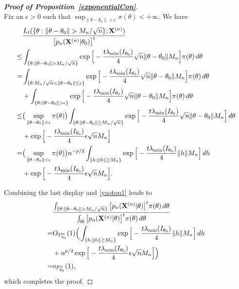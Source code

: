 \documentclass[11pt]{article}
\theoremstyle{plain}
\theoremstyle{definition}
\theoremstyle{remark}
\begin{document}
\begin{appendices}
\begin{proof}[\textbf{Proof of Proposition~\ref{exponentialCon}}]
$$    $$
    Fix an $\epsilon>0$ such that $\sup_{\|\theta-\theta_0\|< \epsilon}\pi(\theta) < +\infty $. We have
$$
    \begin{aligned}
        &
    \frac{L_t({\{\theta:\|\theta-\theta_0\|> M_n/\sqrt{n}\}};\BX^{(n)})}{
        \big[p_n(\BX^{(n)}|\theta_0)\big]^t 
    }
        \\
        \leq&
        \int_{\{\theta:\|\theta-\theta_0\|> M_n/\sqrt{n}\}} 
        \exp\Big[-\frac{t\lambda_{\min}(I_{\theta_0})}{4}\sqrt{n}\|\theta-\theta_0\|M_n\Big]
        \pi(\theta)\, d\theta
        \\
        =&
        \int_{\{\theta:M_n/\sqrt{n}< \|\theta-\theta_0\|\leq \epsilon \}} 
        \exp\Big[-\frac{t\lambda_{\min}(I_{\theta_0})}{4}\sqrt{n}\|\theta-\theta_0\|M_n\Big]
        \pi(\theta)\, d\theta
        \\
        &+
        \int_{\{\theta:\|\theta-\theta_0\|> \epsilon\}} 
        \exp\Big[-\frac{t\lambda_{\min}(I_{\theta_0})}{4}\sqrt{n}\|\theta-\theta_0\|M_n\Big]
        \pi(\theta)\, d\theta
        \\
        \leq& 
        \big(\sup_{\|\theta-\theta_0\|<\epsilon}\pi(\theta)\big)
        \int_{\{\theta: \|\theta-\theta_0\|\geq M_n/\sqrt{n}\}} 
        \exp\Big[-\frac{t\lambda_{\min}(I_{\theta_0})}{4}\sqrt{n}\|\theta-\theta_0\|M_n\Big]
        \, d\theta
        \\
        &+
        \exp\Big[-\frac{t\lambda_{\min}(I_{\theta_0})}{4}\epsilon\sqrt{n}M_n\Big]
        \\
        =& 
        \big(\sup_{\|\theta-\theta_0\|<\epsilon}\pi(\theta)\big)
        n^{-p/2}
        \int_{\{h: \|h\|\geq M_n\}} 
        \exp\Big[-\frac{t\lambda_{\min}(I_{\theta_0})}{4}\|h\| M_n\Big]
        \, dh
        \\
        &+
        \exp\Big[-\frac{t\lambda_{\min}(I_{\theta_0})}{4}\epsilon\sqrt{n}M_n\Big]
        .
    \end{aligned}
$$

Combining the last display and \eqref{yaotou1} leads to
$$
    \begin{aligned}
        &\frac{
            \int_{\{\theta:\|\theta-\theta_0\|> M_n/\sqrt{n}\}} \big[p_n(\BX^{(n)}|\theta)\big]^t \pi(\theta)\, d\theta
        }
        {
            \int_{\Theta} \big[p_n(\BX^{(n)}|\theta)\big]^t \pi(\theta)\, d\theta
        }
        \\
        =&
        O_{P_{\theta_0}^n}(1)
        \Big(
        \int_{\{h: \|h\|\geq M_n\}} 
        \exp\Big[-\frac{t\lambda_{\min}(I_{\theta_0})}{4}\|h\| M_n\Big]
        \, dh
        \\
        &+
        n^{p/2}\exp\Big[-\frac{t\lambda_{\min}(I_{\theta_0})}{4}\epsilon\sqrt{n}M_n\Big]
        \Big)
        \\
        =&o_{P^n_{\theta_0}}(1),
    \end{aligned}
$$
which completes the proof.


\end{proof}
\end{appendices}
\end{document}

